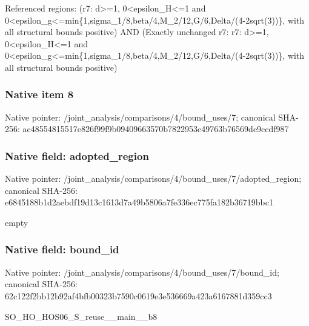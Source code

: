 \documentclass[10pt,a4paper]{article}
\begin{document}
\begingroup\raggedright\sloppy Referenced regions:\allowbreak{} (r7:\allowbreak{} d>=\allowbreak{}1,\allowbreak{} 0<epsilon\_\allowbreak{}H<=\allowbreak{}1 and 0<epsilon\_\allowbreak{}g<=\allowbreak{}min\{1,\allowbreak{}sigma\_\allowbreak{}1/\allowbreak{}8,\allowbreak{}beta/\allowbreak{}4,\allowbreak{}M\_\allowbreak{}2/\allowbreak{}12,\allowbreak{}G/\allowbreak{}6,\allowbreak{}Delta/\allowbreak{}(4-2sqrt(3))\},\allowbreak{} with all structural bounds positive) AND (Exactly unchanged r7:\allowbreak{} r7:\allowbreak{} d>=\allowbreak{}1,\allowbreak{} 0<epsilon\_\allowbreak{}H<=\allowbreak{}1 and 0<epsilon\_\allowbreak{}g<=\allowbreak{}min\{1,\allowbreak{}sigma\_\allowbreak{}1/\allowbreak{}8,\allowbreak{}beta/\allowbreak{}4,\allowbreak{}M\_\allowbreak{}2/\allowbreak{}12,\allowbreak{}G/\allowbreak{}6,\allowbreak{}Delta/\allowbreak{}(4-2sqrt(3))\},\allowbreak{} with all structural bounds positive)\par\endgroup

\subsubsection{Native item 8}
Native pointer: /joint\_\allowbreak{}analysis/comparisons/4/bound\_\allowbreak{}uses/7; canonical SHA-256: ac48554815517e826f99f9b09409663570b7822953c49763b76569de9ccdf987

\subsubsection{Native field: adopted\_\allowbreak{}region}
Native pointer: /joint\_\allowbreak{}analysis/comparisons/4/bound\_\allowbreak{}uses/7/adopted\_\allowbreak{}region; canonical SHA-256: e6845188b1d2aebdf19d13c1613d7a49b5806a7fe336ec775fa182b36719bbc1

\begingroup\raggedright\sloppy empty\par\endgroup

\subsubsection{Native field: bound\_\allowbreak{}id}
Native pointer: /joint\_\allowbreak{}analysis/comparisons/4/bound\_\allowbreak{}uses/7/bound\_\allowbreak{}id; canonical SHA-256: 62c122f2bb12b92af4bfb00323b7590c0619e3e536669a423a6167881d359cc3

\begingroup\raggedright\sloppy SO\_\allowbreak{}HO\_\allowbreak{}HOS06\_\allowbreak{}S\_\allowbreak{}reuse\_\allowbreak{}\_\allowbreak{}main\_\allowbreak{}\_\allowbreak{}b8\par\endgroup
\end{document}
